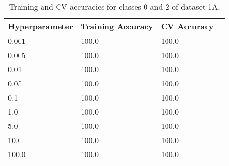 \def\arraystretch{1.25}
\begin{table}[H]
{\small
\centering
\begin{tabular}{l l l c}
\hline
\hline
\textbf{Hyperparameter} & \textbf{Training Accuracy}  &  \textbf{CV Accuracy}\\
\hline
\hline
0.001 & 100.0 & 100.0\\
0.005 & 100.0 & 100.0\\
0.01 & 100.0 & 100.0\\
0.05 & 100.0 & 100.0\\
0.1 & 100.0 & 100.0\\
1.0 & 100.0 & 100.0\\
5.0 & 100.0 & 100.0\\
10.0 & 100.0 & 100.0\\
100.0 & 100.0 & 100.0\\
\hline
\end{tabular}
\caption{Training and CV accuracies for classes 0 and 2 of dataset 1A.}
}
\end{table}